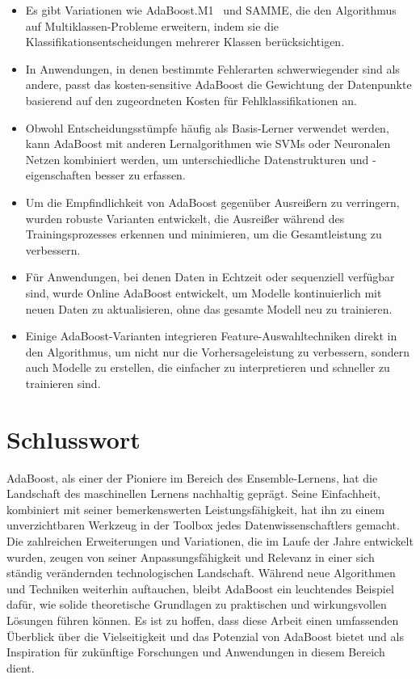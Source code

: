 \documentclass[11pt,a4paper,oneside]{scrartcl}
\begin{document}
\begin{itemize}
    \item  Es gibt Variationen wie \glqq AdaBoost.M1\grqq~ und \glqq SAMME\grqq, die den Algorithmus auf
          Multiklassen-Probleme erweitern, indem sie die Klassifikationsentscheidungen
          mehrerer Klassen berücksichtigen.
    \item In Anwendungen, in denen bestimmte Fehlerarten schwerwiegender sind als andere,
          passt das kosten-sensitive AdaBoost die Gewichtung der Datenpunkte basierend auf den
          zugeordneten Kosten für Fehlklassifikationen an.
    \item Obwohl Entscheidungsstümpfe häufig als Basis-Lerner verwendet werden,
          kann AdaBoost mit anderen Lernalgorithmen wie SVMs oder Neuronalen Netzen kombiniert
          werden, um unterschiedliche Datenstrukturen und -eigenschaften besser zu erfassen.
    \item Um die Empfindlichkeit von AdaBoost gegenüber Ausreißern zu verringern,
          wurden robuste Varianten entwickelt, die Ausreißer während des Trainingsprozesses
          erkennen und minimieren, um die Gesamtleistung zu verbessern.
    \item Für Anwendungen, bei denen Daten in Echtzeit oder sequenziell verfügbar sind,
          wurde Online AdaBoost entwickelt, um Modelle kontinuierlich mit neuen Daten zu
          aktualisieren, ohne das gesamte Modell neu zu trainieren.
    \item Einige AdaBoost-Varianten integrieren Feature-Auswahltechniken direkt in den
          Algorithmus, um nicht nur die Vorhersageleistung zu verbessern, sondern auch Modelle
          zu erstellen, die einfacher zu interpretieren und schneller zu trainieren sind.
\end{itemize}

\section{Schlusswort}
AdaBoost, als einer der Pioniere im Bereich des Ensemble-Lernens, hat die Landschaft des maschinellen Lernens
nachhaltig geprägt. Seine Einfachheit, kombiniert mit seiner bemerkenswerten Leistungsfähigkeit, hat ihn zu
einem unverzichtbaren Werkzeug in der Toolbox jedes Datenwissenschaftlers gemacht. Die zahlreichen Erweiterungen
und Variationen, die im Laufe der Jahre entwickelt wurden, zeugen von seiner Anpassungsfähigkeit und Relevanz in
einer sich ständig verändernden technologischen Landschaft. Während neue Algorithmen und Techniken weiterhin
auftauchen, bleibt AdaBoost ein leuchtendes Beispiel dafür, wie solide theoretische Grundlagen zu praktischen
und wirkungsvollen Lösungen führen können. Es ist zu hoffen, dass diese Arbeit einen umfassenden Überblick über
die Vielseitigkeit und das Potenzial von AdaBoost bietet und als Inspiration für zukünftige Forschungen und
Anwendungen in diesem Bereich dient.


\end{document}
